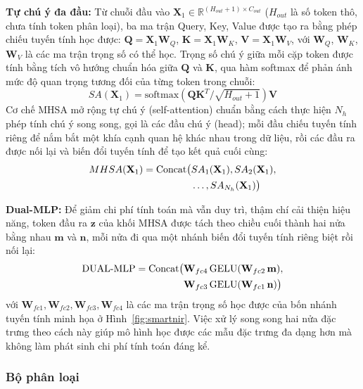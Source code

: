 \documentclass[10pt,twocolumn,twoside]{article}
\begin{document}
\textbf{Tự chú ý đa đầu:} Từ chuỗi đầu vào $\mathbf{X}_1 \in
\mathbb{R}^{(H_{out}+1)\times C_{out}}$ ($H_{out}$ là số token thô, chưa
tính token phân loại), ba ma trận Query, Key, Value được tạo ra bằng phép
chiếu tuyến tính học được: $\mathbf{Q} = \mathbf{X}_1 \mathbf{W}_Q$,
$\mathbf{K} = \mathbf{X}_1 \mathbf{W}_K$, $\mathbf{V} = \mathbf{X}_1
\mathbf{W}_V$, với $\mathbf{W}_Q$, $\mathbf{W}_K$, $\mathbf{W}_V$ là các ma
trận trọng số có thể học. Trọng số chú ý giữa mỗi cặp token được tính bằng
tích vô hướng chuẩn hóa giữa $\mathbf{Q}$ và $\mathbf{K}$, qua hàm softmax để
phản ánh mức độ quan trọng tương đối của từng token trong chuỗi:
\begin{equation}
SA(\mathbf{X}_1) = \mathrm{softmax}\!\left(\mathbf{Q}\mathbf{K}^{T}/\sqrt{H_{out}+1}\right)\mathbf{V}
\label{eq:sa}
\end{equation}
Cơ chế MHSA mở rộng tự chú ý (self-attention) chuẩn bằng cách thực hiện
$N_h$ phép tính chú ý song song, gọi là các đầu chú ý (head); mỗi đầu chiếu
tuyến tính riêng để nắm bắt một khía cạnh quan hệ khác nhau trong dữ liệu,
rồi các đầu ra được nối lại và biến đổi tuyến tính để tạo kết quả cuối cùng:
\begin{align}
MHSA(\mathbf{X}_1) = \mathrm{Concat}\big(&SA_1(\mathbf{X}_1), SA_2(\mathbf{X}_1), \notag\\
&\dots, SA_{N_h}(\mathbf{X}_1)\big)
\label{eq:mhsa}
\end{align}

\textbf{Dual-MLP:} Để giảm chi phí tính toán mà vẫn duy trì, thậm chí cải
thiện hiệu năng, token đầu ra $\mathbf{z}$ của khối MHSA được tách theo
chiều cuối thành hai nửa bằng nhau $\mathbf{m}$ và $\mathbf{n}$, mỗi nửa đi
qua một nhánh biến đổi tuyến tính riêng biệt rồi nối lại:
\begin{align}
\mathrm{DUAL\text{-}MLP} = \mathrm{Concat}\big(&\mathbf{W}_{fc4}\,\mathrm{GELU}(\mathbf{W}_{fc2}\,\mathbf{m}), \notag\\
&\mathbf{W}_{fc3}\,\mathrm{GELU}(\mathbf{W}_{fc1}\,\mathbf{n})\big)
\label{eq:dualmlp}
\end{align}
với $\mathbf{W}_{fc1}, \mathbf{W}_{fc2}, \mathbf{W}_{fc3}, \mathbf{W}_{fc4}$
là các ma trận trọng số học được của bốn nhánh tuyến tính minh họa ở
Hình~\ref{fig:smartnir}. Việc xử lý song song hai nửa đặc trưng theo cách
này giúp mô hình học được các mẫu đặc trưng đa dạng hơn mà không làm phát
sinh chi phí tính toán đáng kể.

\subsubsection{Bộ phân loại}
\end{document}
